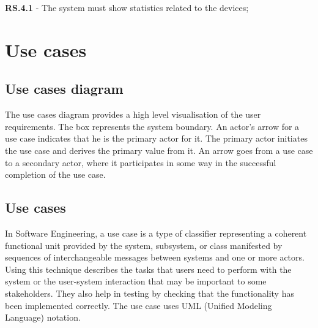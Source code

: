 \documentclass{scrreprt}
\begin{document}
\textbf{RS.4.1} - The system must show statistics related to the devices;

\chapter{Use cases}

\section{Use cases diagram}

The use cases diagram provides a high level visualisation of the user
requirements. The box represents the system boundary. An actor's arrow
for a use case indicates that he is the primary actor for it.
\newline
The primary actor initiates the use case and derives the primary value
from it. An arrow goes from a use case to a secondary actor, where it
participates in some way in the successful completion of the use case. \cite{wiegers2013software}

\section{Use cases}

In Software Engineering, a use case is a type of classifier representing a
coherent functional unit provided by the system, subsystem, or class manifested
by sequences of interchangeable messages between systems and one or more
actors. \cite{UseUsability}
\newline
Using this technique describes the tasks that users need to perform with
the system or the user-system interaction that may be important to some
stakeholders. They also help in testing by checking that the functionality
has been implemented correctly. The use case uses UML (Unified Modeling
Language) notation.
\end{document}
